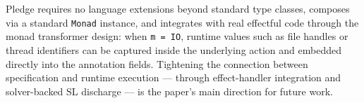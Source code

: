 \documentclass[acmsmall,screen]{acmart}
\begin{document}
Pledge requires no language extensions beyond standard type classes,
composes via a standard \lstinline{Monad} instance, and integrates with
real effectful code through the monad transformer design: when
\lstinline{m = IO}, runtime values such as file handles or thread
identifiers can be captured inside the underlying action and embedded
directly into the annotation fields.
Tightening the connection between specification and runtime execution ---
through effect-handler integration and solver-backed SL discharge --- is
the paper's main direction for future work.



\end{document}
